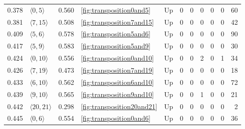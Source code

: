 \documentclass{article}
\begin{document}
\begin{center}
\begin{tabular}{lllllrrrrrr}
\cline{1-11} \cline{2-11} \cline{3-11} \cline{4-11}
0.378 & $\langle0, 5\rangle$ & 0.560 & \ref{fig:transposition0and5} & Up & 0 & 0 & 0 & 0 & 0 & 60 \\
\cline{1-11} \cline{2-11} \cline{3-11} \cline{4-11}
0.381 & $\langle7, 15\rangle$ & 0.508 & \ref{fig:transposition7and15} & Up & 0 & 0 & 0 & 0 & 0 & 42 \\
\cline{1-11} \cline{2-11} \cline{3-11} \cline{4-11}
0.409 & $\langle5, 6\rangle$ & 0.578 & \ref{fig:transposition5and6} & Up & 0 & 0 & 0 & 0 & 0 & 90 \\
\cline{1-11} \cline{2-11} \cline{3-11} \cline{4-11}
0.417 & $\langle5, 9\rangle$ & 0.583 & \ref{fig:transposition5and9} & Up & 0 & 0 & 0 & 0 & 0 & 30 \\
\cline{1-11} \cline{2-11} \cline{3-11} \cline{4-11}
0.424 & $\langle0, 10\rangle$ & 0.556 & \ref{fig:transposition0and10} & Up & 0 & 0 & 2 & 0 & 1 & 34 \\
\cline{1-11} \cline{2-11} \cline{3-11} \cline{4-11}
0.426 & $\langle7, 19\rangle$ & 0.473 & \ref{fig:transposition7and19} & Up & 0 & 0 & 0 & 0 & 0 & 18 \\
\cline{1-11} \cline{2-11} \cline{3-11} \cline{4-11}
0.433 & $\langle6, 10\rangle$ & 0.562 & \ref{fig:transposition6and10} & Up & 0 & 0 & 0 & 0 & 0 & 72 \\
\cline{1-11} \cline{2-11} \cline{3-11} \cline{4-11}
0.439 & $\langle9, 10\rangle$ & 0.565 & \ref{fig:transposition9and10} & Up & 0 & 0 & 1 & 0 & 0 & 21 \\
\cline{1-11} \cline{2-11} \cline{3-11} \cline{4-11}
0.442 & $\langle20, 21\rangle$ & 0.298 & \ref{fig:transposition20and21} & Up & 0 & 0 & 0 & 0 & 0 & 2 \\
\cline{1-11} \cline{2-11} \cline{3-11} \cline{4-11}
0.445 & $\langle0, 6\rangle$ & 0.554 & \ref{fig:transposition0and6} & Up & 0 & 0 & 0 & 0 & 0 & 36 \\
\cline{1-11} \cline{2-11} \cline{3-11} \cline{4-11}
\bottomrule
\end{tabular}


\end{center}
\end{document}
